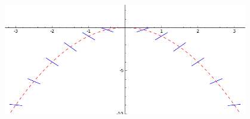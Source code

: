 \documentclass[12pt]{amsart}
\begin{document}
\begin{center}
  \includegraphics[width=0.8\textwidth]{mx2p3sinxdx.png}
\end{center}
\end{document}
